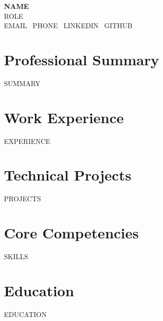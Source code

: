 \documentclass[11pt,a4paper]{article}
\begin{document}
\begin{flushleft}
    {\Huge \textbf{\color{primary} {{NAME}}}} \\
    \vspace{2mm}
    {\Large {{ROLE}}} \\
    \vspace{2mm}
    {{EMAIL}} \textbullet\ {{PHONE}} \textbullet\ {{LINKEDIN}} \textbullet\ {{GITHUB}}
\end{flushleft}

\vspace{4mm}
\section*{Professional Summary}
{{SUMMARY}}

\section*{Work Experience}
{{EXPERIENCE}}

\section*{Technical Projects}
{{PROJECTS}}

\section*{Core Competencies}
{{SKILLS}}

\section*{Education}
{{EDUCATION}}
\end{document}
